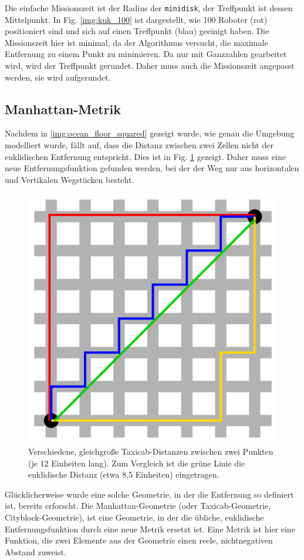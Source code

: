 \documentclass{article}
\begin{document}
Die einfache Missionszeit ist der Radius der \texttt{minidisk}, der Treffpunkt ist dessen Mittelpunkt. In Fig. \ref{img:kuk_100} ist dargestellt,
wie 100 Roboter (rot) positioniert sind und sich auf einen Treffpunkt (blau) geeinigt haben. Die Missionszeit hier ist minimal, da der Algorithmus versucht, die maximale Entfernung zu einem Punkt zu minimieren. Da nur mit Ganzzahlen gearbeitet wird, wird der Treffpunkt gerundet. Daher muss auch die Missionszeit angepasst werden, sie wird aufgerundet.

\subsection{Manhattan-Metrik}
\label{sec:manhattan}

Nachdem in \ref{img:ocean_floor_squared} gezeigt wurde, wie genau die Umgebung
modelliert wurde, fällt auf, dass die Distanz zwischen zwei Zellen nicht der euklidischen Entfernung
entspricht. Dies ist in Fig. \ref{img:taxicab_euclid} gezeigt. Daher muss eine neue Entfernungsfunktion 
gefunden werden, bei der der Weg nur aus horizontalen und Vertikalen Wegstücken besteht.

\begin{figure}[!ht]
  \centering
  \includegraphics[width=.45\textwidth]{img/taxicab_distance.png}
  \caption{Verschiedene, gleichgroße Taxicab-Distanzen zwischen zwei Punkten (je 12 Einheiten lang). 
  Zum  Vergleich ist die grüne Linie die euklidische Distanz (etwa 8,5 Einheiten) eingetragen. \cite{wikicity}}
  \label{img:taxicab_euclid}
\end{figure}

Glücklicherweise wurde eine solche Geometrie, in der die Entfernung so definiert ist, bereits erforscht.
Die Manhattan-Geometrie (oder Taxicab-Geometrie, Cityblock-Geometrie), ist eine Geometrie, in der
die übliche, euklidische Entfernungsfunktion durch eine neue Metrik ersetzt ist. Eine Metrik ist hier
eine Funktion, die zwei Elemente aus der Geometrie einen reele, nichtnegativen Abstand zuweist.
\end{document}
